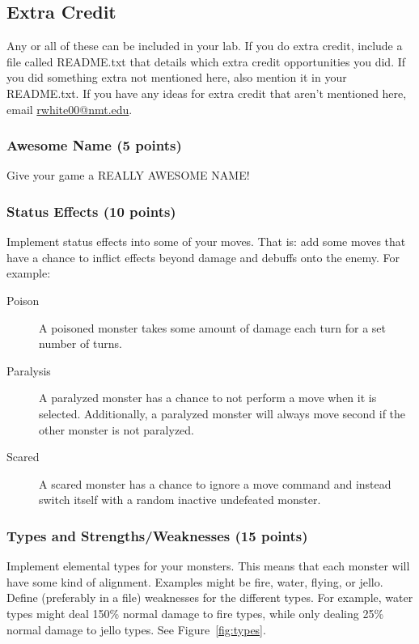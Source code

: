 \documentclass[11pt]{cselabheader}
\begin{document}
\subsection{Extra Credit}
Any or all of these can be included in your lab. If you do extra credit, include
a file called README.txt that details which extra credit opportunities you did.
If you did something extra not mentioned here, also mention it in your
README.txt.  If you have any ideas for extra credit that aren't mentioned here,
email \href{mailto:rwhite00@nmt.edu}{rwhite00@nmt.edu}.

\subsubsection{Awesome Name (5 points)}
Give your game a REALLY AWESOME NAME!

\subsubsection{Status Effects (10 points)}
Implement status effects into some of your moves. That is: add some moves that
have a chance to inflict effects beyond damage and debuffs onto the enemy. For
example:
\begin{description}
\item[Poison] A poisoned monster takes some amount of damage each turn for a set
  number of turns.
\item[Paralysis] A paralyzed monster has a chance to not perform a move when it
  is selected. Additionally, a paralyzed monster will always move second if the
  other monster is not paralyzed.
\item[Scared] A scared monster has a chance to ignore a move command and instead
  switch itself with a random inactive undefeated monster.
\end{description}

\subsubsection{Types and Strengths/Weaknesses (15 points)}
Implement elemental types for your monsters. This means that each monster will
have some kind of alignment. Examples might be fire, water, flying, or jello.
Define (preferably in a file) weaknesses for the different types. For example,
water types might deal 150\% normal damage to fire types, while only dealing
25\% normal damage to jello types. See Figure~\ref{fig:types}.
\end{document}
